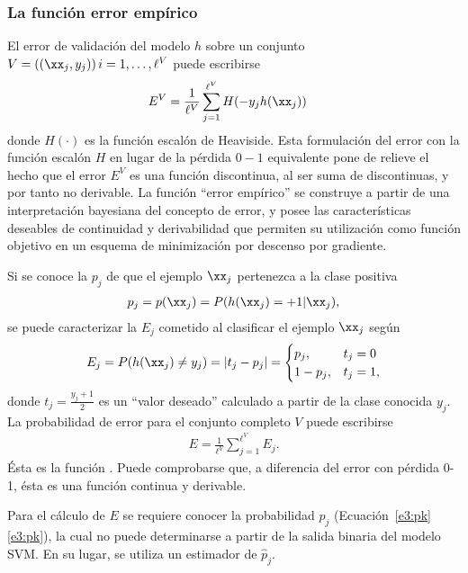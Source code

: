 %
\subsubsection{La función error empírico}
%
El error de validación del modelo $h$ sobre un conjunto
$V=((\xx_j,y_j))\,i=1,\ldots,\ell^V$ puede escribirse
%
\begin{align}
\label{e3:error-test-alt}
  E^V &= \frac{1}{\ell^V}\sum_{j=1}^{\ell^V} H(-{y}_j {h}(\xx_j))
\end{align}
%
donde $H(\cdot)$ es la función escalón de Heaviside. Esta formulación
del error con la función escalón $H$ en lugar de la pérdida $0-1$
equivalente pone de relieve el hecho que el error $E^V$ es una función
discontinua, al ser suma de discontinuas, y por tanto no derivable.
La función ``error empírico'' \cite{ayat} se construye a partir de una
interpretación bayesiana del concepto de error, y posee las
características deseables de continuidad y derivabilidad que permiten
su utilización como función objetivo en un esquema de minimización por
descenso por gradiente.

Si se conoce la  $p_j$ de que el ejemplo
$\xx_j$ pertenezca a la clase positiva
%
\begin{align}
  \label{e3:pk}
  p_j = p(\xx_j) = P(h(\xx_j)=+1|\xx_j),
\end{align}
%
se puede caracterizar la  $E_j$ cometido al
clasificar el ejemplo $\xx_j$ según
%
\begin{align}
\label{e3:Ek}
  E_j = P(h(\xx_j)\neq y_j) = |t_j-{p}_j| =
  \begin{cases}
    {p}_j, & t_j=0\\ 1-{p}_j, & t_j = 1,
  \end{cases}
\end{align}
%
donde $t_j=\frac{y_j+1}{2}$ es un ``valor deseado'' calculado a partir
de la clase conocida $y_j$. La probabilidad de error para el conjunto
completo $V$ puede escribirse
%
\begin{align}
\label{Err1}
  E = \frac{1}{\ell^V}\sum_{j=1}^{\ell^V} E_j.
\end{align}
%
Ésta es la función . Puede comprobarse que, a
diferencia del error con pérdida 0-1, ésta es una función continua y
derivable.

Para el cálculo de $E$ se requiere conocer la probabilidad $p_j$
(\iflatexml{}Ecuación~\ref{e3:pk}\else\autoref{e3:pk}\fi), la cual no
puede determinarse a partir de la salida binaria del modelo SVM.  En
su lugar, se utiliza un estimador de $\hat{p}_j$.
